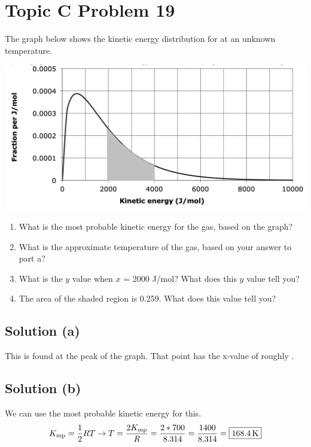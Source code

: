 \documentclass[10pt]{article}
\begin{document}
    \pagebreak
    \section{Topic C Problem 19}
        The graph below shows the kinetic energy distribution for  at an unknown temperature.
        \begin{center}
            \includegraphics[width=\textwidth]{picture_C-19.png}
        \end{center}
        
        \begin{enumerate} [label=\alph*)]
            \item What is the most probable kinetic energy for the gas, based on the graph?
            \item What is the approximate temperature of the gas, based on your answer to part a?
            \item What is the $y$ value when $x$ = 2000 J/mol? What does this $y$ value tell you?
            \item The area of the shaded region is 0.259. What does this value tell you?
        \end{enumerate}

        \subsection{Solution (a)}
            This is found at the peak of the graph.
            That point has the x-value of roughly . 

        \subsection{Solution (b)}
            We can use the most probable kinetic energy for this. 
            \begin{gather}
                K_{\rm mp} = \frac{1}{2} RT \to
                T   =   \frac{2K_{\rm mp}}{R}
                    =   \frac{2 * 700}{8.314}
                    =   \frac{1400}{8.314}
                    =   \boxed{168.4\,\unit{\kelvin}}
            \end{gather}
        
\end{document}
